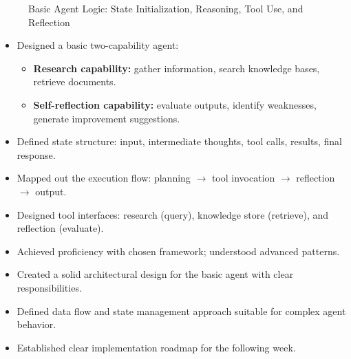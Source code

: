 \begin{itemize}
\begin{figure}[H]
{%
}
\vspace{1pt}
\caption{Basic Agent Logic: State Initialization, Reasoning, Tool Use, and Reflection}
\label{fig:agent_logic}
\end{figure}
    \begin{itemize}
        \item Designed a basic two-capability agent:
        \begin{itemize}
            \item \textbf{Research capability:} gather information, search knowledge bases, retrieve documents.
            \item \textbf{Self-reflection capability:} evaluate outputs, identify weaknesses, generate improvement suggestions.
        \end{itemize}
        \item Defined state structure: input, intermediate thoughts, tool calls, results, final response.
        \item Mapped out the execution flow: planning $\rightarrow$ tool invocation $\rightarrow$ reflection $\rightarrow$ output.
        \item Designed tool interfaces: research (query), knowledge store (retrieve), and reflection (evaluate).
    \end{itemize}
\end{itemize}




\begin{itemize}
    \item Achieved proficiency with chosen framework; understood advanced patterns.
    \item Created a solid architectural design for the basic agent with clear responsibilities.
    \item Defined data flow and state management approach suitable for complex agent behavior.
    \item Established clear implementation roadmap for the following week.
\end{itemize}

